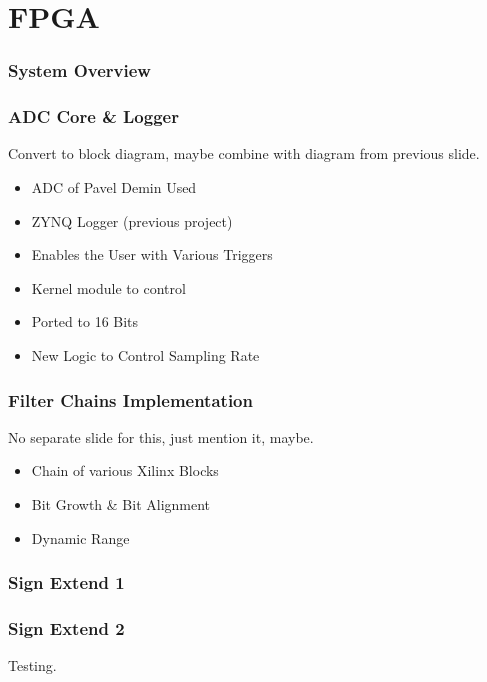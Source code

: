 \section{FPGA}

\begin{frame}
    \frametitle{System Overview}

    \centering
    
    
\end{frame}

\begin{frame}
    \frametitle{ADC Core \& Logger}

    Convert to block diagram, maybe combine with diagram from previous slide.

    \begin{itemize}
        \item
            ADC of Pavel Demin Used
        \item
            ZYNQ Logger (previous project)
        \item
            Enables the User with Various Triggers
        \item
            Kernel module to control
        \item
            Ported to 16 Bits
        \item
            New Logic to Control Sampling Rate
    \end{itemize}
\end{frame}

\begin{frame}
    \frametitle{Filter Chains Implementation}

    No separate slide for this, just mention it, maybe.

    \begin{itemize}
        \item
            Chain of various Xilinx Blocks
        \item
            Bit Growth \& Bit Alignment
        \item
            Dynamic Range
    \end{itemize}
\end{frame}

\begin{frame}
    \frametitle<1>{Sign Extend 1}
    \frametitle<2>{Sign Extend 2}

    \begin{overprint}
        Testing.

        
    \end{overprint}

    \centering
    
\end{frame}

